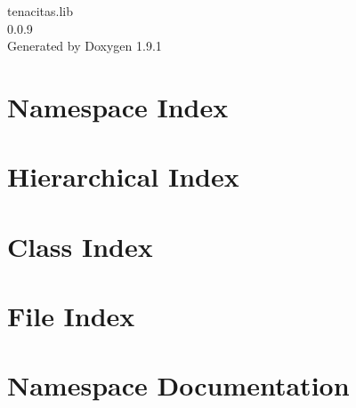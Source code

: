 \let\mypdfximage\pdfximage\def\pdfximage{\immediate\mypdfximage}\documentclass[twoside]{book}
\newcommand{\+}{\discretionary{\mbox{\scriptsize$\hookleftarrow$}}{}{}}
\newcommand{\clearemptydoublepage}{%
  \newpage{\pagestyle{empty}\cleardoublepage}%
}
\begin{document}
\raggedbottom

\hypersetup{pageanchor=false,
             bookmarksnumbered=true,
             pdfencoding=unicode
            }
\begin{titlepage}
\vspace*{7cm}
\begin{center}%
{\Large tenacitas.\+lib \\[1ex]\large 0.\+0.\+9 }\\
\vspace*{1cm}
{\large Generated by Doxygen 1.9.1}\\
\end{center}
\end{titlepage}
\clearemptydoublepage
{}
\tableofcontents
\clearemptydoublepage
{}
\hypersetup{pageanchor=true}

\chapter{Namespace Index}

\chapter{Hierarchical Index}

\chapter{Class Index}

\chapter{File Index}

\chapter{Namespace Documentation}








\end{document}
